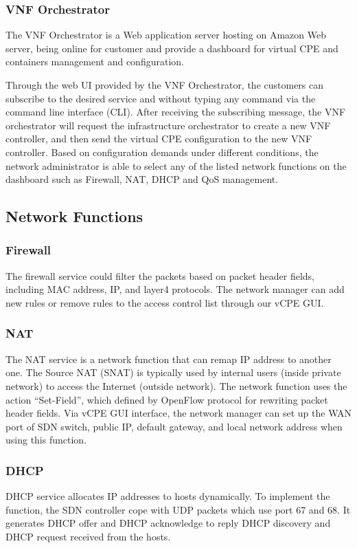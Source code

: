 \documentclass[journal]{IEEEtran}
\begin{document}
\subsubsection{VNF Orchestrator}
The VNF Orchestrator is a Web application server hosting on Amazon Web server,
being online for customer and provide a dashboard for virtual CPE and containers management and configuration.

Through the web UI provided by the VNF Orchestrator,
the customers can subscribe to the desired service and without typing any command via the command line interface (CLI).
After receiving the subscribing message, the VNF orchestrator will request the infrastructure orchestrator to create a new VNF controller,
and then send the virtual CPE configuration to the new VNF controller.
Based on configuration demands under different conditions,
the network administrator is able to select any of the listed network functions on the dashboard
such as Firewall, NAT, DHCP and QoS management.


\subsection{Network Functions}
\subsubsection{Firewall}
The firewall service could filter the packets based on packet header fields, including MAC address, IP, and layer4 protocols.
The network manager can add new rules or remove rules to the access control list through our vCPE GUI.

\subsubsection{NAT}
The NAT service is a network function that can remap  IP address to another one.
The Source NAT (SNAT) is typically used by internal users (inside private network) to access the Internet (outside network).
The network function uses the action “Set-Field”, which defined by OpenFlow protocol for rewriting packet header fields.
Via vCPE GUI interface, the network manager can set up the WAN port of SDN switch,
public IP, default gateway, and local network address when using this function.

\subsubsection{DHCP}
DHCP service allocates IP addresses to hosts dynamically. To implement the function, the SDN controller cope with UDP packets which use port 67 and 68. It generates DHCP offer and DHCP acknowledge to reply DHCP discovery and DHCP request received from the hosts.
\end{document}
